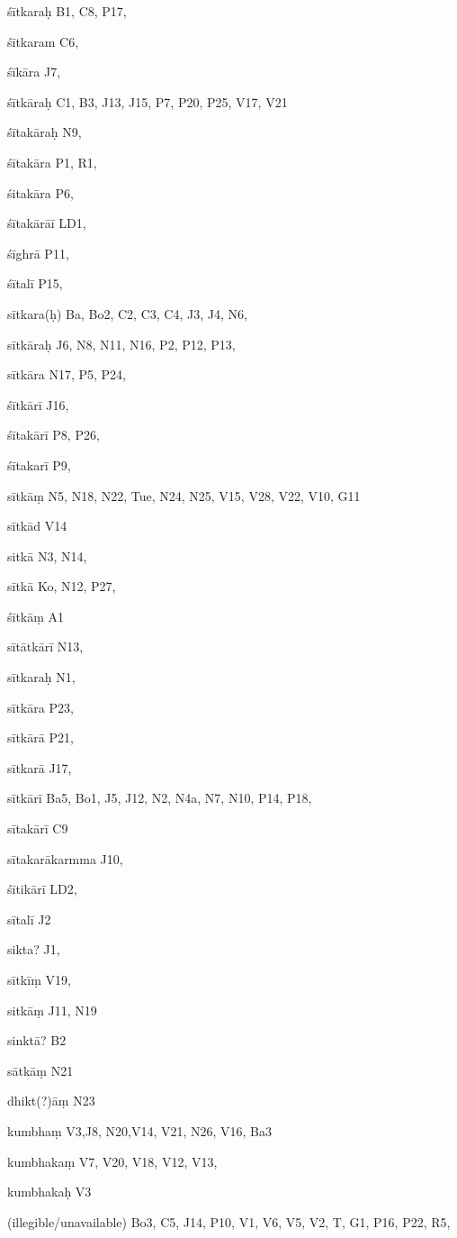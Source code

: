 \begin{marma}[hp02_009]
\begin{marma}[hp02_011]
\begin{marma}[hp02_55ab]
  \begin{description}

    \end{description}
 \end{marma}

 \begin{marma}[hp02_54a]
\item[śītkaraḥ] B1, C8, P17, 
\item[śītkaram] C6,
\item[śīkāra] J7,
\item[śītkāraḥ] C1, B3, J13, J15, P7, P20, P25, V17, V21 
\item[śītakāraḥ] N9, 
\item[śītakāra] P1, R1, 
\item[śitakāra] P6, 
\item[śītakārāī] LD1, 
\item[śīghrā] P11,
\item[śītalī] P15,  
\item[sītkara(ḥ)] Ba, Bo2, C2, C3, C4, J3, J4, N6, 
\item[sītkāraḥ] J6, N8, N11, N16, P2, P12, P13, 
\item[sītkāra] N17, P5, P24, 
\item[śītkārī] J16, 
\item[śītakārī] P8, P26, 
\item[śītakarī] P9,
\item[sītkāṃ] N5, N18, N22, Tue, N24, N25, V15, V28, V22, V10, G11
\item[sītkād] V14
\item[sitkā] N3, N14, 
\item[sītkā] Ko, N12, P27, 
\item[śītkāṃ] A1
\item[sītātkārī] N13,
\item[sītkaraḥ] N1,
\item[sītkāra] P23,
\item[sītkārā] P21,
\item[sītkarā] J17, 
\item[sītkārī] Ba5, Bo1, J5, J12, N2, N4a, N7, N10, P14, P18,    
\item[sītakārī] C9
\item[sītakarākarmma] J10, 
\item[śītikārī] LD2,
\item[sītalī] J2
\item[sikta?] J1,
\item[sītkīṃ] V19,
\item[sitkāṃ] J11, N19
\item[sinktā?] B2
\item[sātkāṃ] N21
\item[dhikt(?)āṃ] N23
\item[kumbhaṃ] V3,J8, N20,V14, V21, N26, V16, Ba3 
\item[kumbhakaṃ] V7, V20, V18, V12, V13, 
\item[kumbhakaḥ] V3
\item[(illegible/unavailable)] Bo3, C5, J14, P10, V1, V6, V5, V2, T, G1, P16, P22, R5,
  \begin{description}


\end{description}
\end{marma}
\end{marma}
\end{marma}
